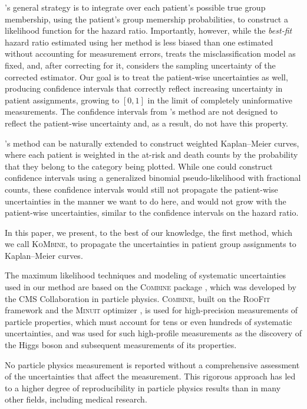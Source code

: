 \documentclass[pdflatex,sn-basic]{sn-jnl}%
\theoremstyle{thmstyleone}%
\theoremstyle{thmstyletwo}%
\theoremstyle{thmstylethree}%
\newcommand{\KM}{Kaplan--Meier} %
\newcommand{\KoMbine}{\textsc{KoMbine}}
\newcommand{\Combine}{\textsc{Combine}}
\newcommand{\RooFit}{\textsc{RooFit}}
\newcommand{\Minuit}{\textsc{Minuit}}
\begin{document}
\citeauthor{YiBook}'s general strategy is to integrate over each patient's possible true group membership, using the patient's group memership probabilities, to construct a likelihood function for the hazard ratio.  Importantly, however, while the \emph{best-fit} hazard ratio estimated using her method is less biased than one estimated without accounting for measurement errors, \citeauthor{YiBook} treats the misclassification model as fixed, and, after correcting for it, considers the sampling uncertainty of the corrected estimator. Our goal is to treat the patient-wise uncertainties as well, producing confidence intervals that correctly reflect increasing uncertainty in patient assignments, growing to \([0, 1]\) in the limit of completely uninformative measurements.  The confidence intervals from \citeauthor{YiBook}'s method are not designed to reflect the patient-wise uncertainty and, as a result, do not have this property.

\citeauthor{YiBook}'s method can be naturally extended to construct weighted \KM{} curves, where each patient is weighted in the at-risk and death counts by the probability that they belong to the category being plotted.  While one could construct confidence intervals using a generalized binomial pseudo-likelihood with fractional counts, these confidence intervals would still not propagate the patient-wise uncertainties in the manner we want to do here, and would not grow with the patient-wise uncertainties, similar to the confidence intervals on the hazard ratio.

In this paper, we present, to the best of our knowledge, the first method, which we call \KoMbine{}, to propagate the uncertainties in patient group assignments to \KM{} curves.

The maximum likelihood techniques and modeling of systematic uncertainties used in our method are based on the \Combine{} package \citep{CAT-23-001}, which was developed by the CMS Collaboration in particle physics\@. \Combine, built on the \RooFit{} framework \citep{RooFit} and the \Minuit{} optimizer \citep{Minuit}, is used for high-precision measurements of particle properties, which must account for tens or even hundreds of systematic uncertainties, and was used for such high-profile measurements as the discovery of the Higgs boson \citep{HIG-12-028} and subsequent measurements of its properties.

No particle physics measurement is reported without a comprehensive assessment of the uncertainties that affect the measurement. This rigorous approach has led to a higher degree of reproducibility in particle physics results than in many other fields, including medical research.
\end{document}
